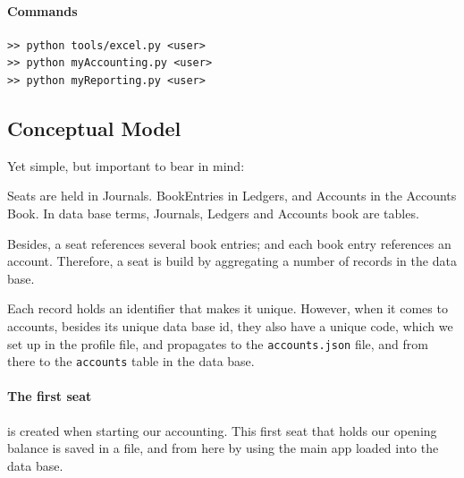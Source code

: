 \documentclass[12pt, a4paper]{article}
\begin{document}
 \paragraph{Commands}
 \begin{verbatim}
>> python tools/excel.py <user>
>> python myAccounting.py <user>
>> python myReporting.py <user>
\end{verbatim}

 \subsection{Conceptual Model}
 Yet simple, but important to bear in mind:
 
 Seats are held in Journals. BookEntries  in Ledgers, and Accounts in  the Accounts Book. In data base terms, Journals, Ledgers and Accounts book are tables.  
 
 Besides, a seat references several book entries; and each book entry references an account.
 Therefore, a seat is build by aggregating a number of  records in the data base.
 
 Each record holds an identifier that makes it unique. However, when it comes to accounts, besides its unique data base id, they also have a unique code, which we set up in the profile file, and propagates to the \verb!accounts.json! file, and from there to the \verb!accounts! table in the data base.
 
 \paragraph{The first seat} is created when starting our accounting. This first seat that holds our opening balance is saved in a file, and from here by using the main app loaded into the data base. 
  \begin{figure}[h]
 \centering
 \end{figure}
\end{document}
